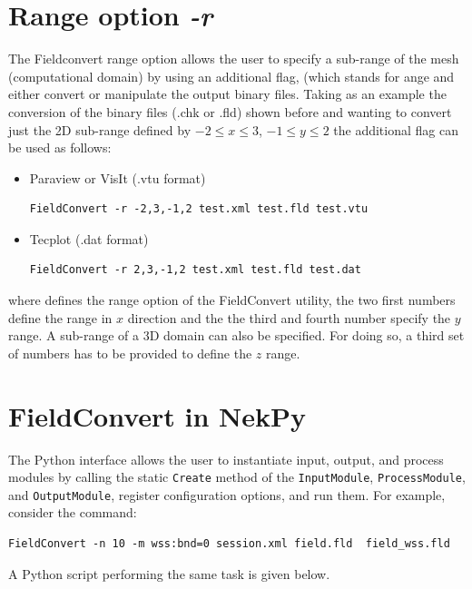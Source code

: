\section{Range option \textit{-r}}
The Fieldconvert range option  allows the user to specify
a sub-range of the mesh (computational domain) by using an
additional flag,  (which stands for ange and either
convert or manipulate the \nekpp output binary files.
Taking as an example the conversion of the \nekpp binary files
(.chk or .fld) shown before and wanting to convert just the 2D
sub-range defined by $-2\leq x \leq 3$, $-1\leq y \leq 2$ the
additional flag  can be used as follows:
%
\begin{itemize}
\item Paraview or VisIt (.vtu format)
%
\begin{lstlisting}[style=BashInputStyle]
FieldConvert -r -2,3,-1,2 test.xml test.fld test.vtu
\end{lstlisting}
%
\item Tecplot (.dat format)
%
\begin{lstlisting}[style=BashInputStyle]
FieldConvert -r 2,3,-1,2 test.xml test.fld test.dat
\end{lstlisting}
%
\end{itemize}
where  defines the range option of the FieldConvert
utility, the two first numbers define the range in $x$ direction
and the the third and fourth number specify the $y$ range.
A sub-range of a 3D domain can also be specified.
For doing so, a third set of numbers has to be provided
to define the $z$ range.
%
%
%

\section{FieldConvert in NekPy}

The Python interface allows the user to instantiate input,
output, and process modules by calling the static \verb+Create+ method of the
\verb+InputModule+, \verb+ProcessModule+, and \verb+OutputModule+,
register configuration options, and run them.
For example, consider the command:

\begin{lstlisting}[style=BashInputStyle]
FieldConvert -n 10 -m wss:bnd=0 session.xml field.fld  field_wss.fld
\end{lstlisting}


A Python script performing the same task is given below.


